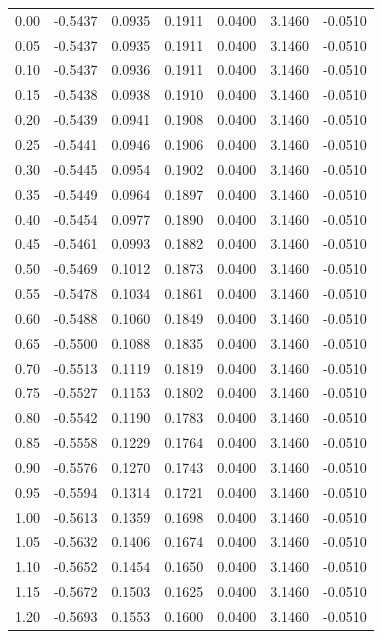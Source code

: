 \begin{longtable}{|c|c|c|c|c|c|c|}
0.00 & -0.5437 & 0.0935 & 0.1911 & 0.0400 & 3.1460 & -0.0510 \\
0.05 & -0.5437 & 0.0935 & 0.1911 & 0.0400 & 3.1460 & -0.0510 \\
0.10 & -0.5437 & 0.0936 & 0.1911 & 0.0400 & 3.1460 & -0.0510 \\
0.15 & -0.5438 & 0.0938 & 0.1910 & 0.0400 & 3.1460 & -0.0510 \\
0.20 & -0.5439 & 0.0941 & 0.1908 & 0.0400 & 3.1460 & -0.0510 \\
0.25 & -0.5441 & 0.0946 & 0.1906 & 0.0400 & 3.1460 & -0.0510 \\
0.30 & -0.5445 & 0.0954 & 0.1902 & 0.0400 & 3.1460 & -0.0510 \\
0.35 & -0.5449 & 0.0964 & 0.1897 & 0.0400 & 3.1460 & -0.0510 \\
0.40 & -0.5454 & 0.0977 & 0.1890 & 0.0400 & 3.1460 & -0.0510 \\
0.45 & -0.5461 & 0.0993 & 0.1882 & 0.0400 & 3.1460 & -0.0510 \\
0.50 & -0.5469 & 0.1012 & 0.1873 & 0.0400 & 3.1460 & -0.0510 \\
0.55 & -0.5478 & 0.1034 & 0.1861 & 0.0400 & 3.1460 & -0.0510 \\
0.60 & -0.5488 & 0.1060 & 0.1849 & 0.0400 & 3.1460 & -0.0510 \\
0.65 & -0.5500 & 0.1088 & 0.1835 & 0.0400 & 3.1460 & -0.0510 \\
0.70 & -0.5513 & 0.1119 & 0.1819 & 0.0400 & 3.1460 & -0.0510 \\
0.75 & -0.5527 & 0.1153 & 0.1802 & 0.0400 & 3.1460 & -0.0510 \\
0.80 & -0.5542 & 0.1190 & 0.1783 & 0.0400 & 3.1460 & -0.0510 \\
0.85 & -0.5558 & 0.1229 & 0.1764 & 0.0400 & 3.1460 & -0.0510 \\
0.90 & -0.5576 & 0.1270 & 0.1743 & 0.0400 & 3.1460 & -0.0510 \\
0.95 & -0.5594 & 0.1314 & 0.1721 & 0.0400 & 3.1460 & -0.0510 \\
1.00 & -0.5613 & 0.1359 & 0.1698 & 0.0400 & 3.1460 & -0.0510 \\
1.05 & -0.5632 & 0.1406 & 0.1674 & 0.0400 & 3.1460 & -0.0510 \\
1.10 & -0.5652 & 0.1454 & 0.1650 & 0.0400 & 3.1460 & -0.0510 \\
1.15 & -0.5672 & 0.1503 & 0.1625 & 0.0400 & 3.1460 & -0.0510 \\
1.20 & -0.5693 & 0.1553 & 0.1600 & 0.0400 & 3.1460 & -0.0510 \\

\end{longtable}
